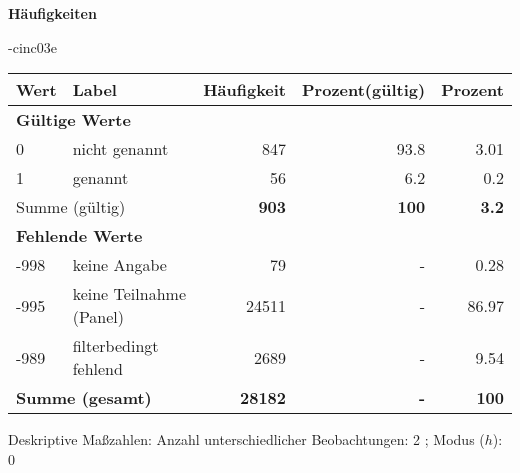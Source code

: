         		\vspace*{0.5cm}
                \noindent\textbf{Häufigkeiten}

                \vspace*{-\baselineskip}
					\begin{filecontents}{\jobname-cinc03e}
					\begin{longtable}{lXrrr}
					\toprule
					\textbf{Wert} & \textbf{Label} & \textbf{Häufigkeit} & \textbf{Prozent(gültig)} & \textbf{Prozent} \\
					\endhead
					\midrule
					\multicolumn{5}{l}{\textbf{Gültige Werte}}\\

					0 &
					\multicolumn{1}{X}{ nicht genannt   } &


					  \num{847} &
					  \num[round-mode=places,round-precision=2]{93.8} &
					    \num[round-mode=places,round-precision=2]{3.01} \\

					1 &
					\multicolumn{1}{X}{ genannt   } &


					  \num{56} &
					  \num[round-mode=places,round-precision=2]{6.2} &
					    \num[round-mode=places,round-precision=2]{0.2} \\
					\midrule
					\multicolumn{2}{l}{Summe (gültig)} &
					  \textbf{\num{903}} &
					\textbf{100} &
					  \textbf{\num[round-mode=places,round-precision=2]{3.2}} \\
					\multicolumn{5}{l}{\textbf{Fehlende Werte}}\\
							-998 &
							keine Angabe &
							  \num{79} &
							 - &
							  \num[round-mode=places,round-precision=2]{0.28} \\
							-995 &
							keine Teilnahme (Panel) &
							  \num{24511} &
							 - &
							  \num[round-mode=places,round-precision=2]{86.97} \\
							-989 &
							filterbedingt fehlend &
							  \num{2689} &
							 - &
							  \num[round-mode=places,round-precision=2]{9.54} \\
					\midrule
					\multicolumn{2}{l}{\textbf{Summe (gesamt)}} &
				      \textbf{\num{28182}} &
				    \textbf{-} &
				    \textbf{100} \\
					\bottomrule
					\end{longtable}
					\end{filecontents}
				\label{tableValues:cinc03e}
				\vspace*{-\baselineskip}
                    \begin{noten}
                	    \note{} Deskriptive Maßzahlen:
                	    Anzahl unterschiedlicher Beobachtungen: 2%
                	    ; 
                	      Modus ($h$): 0
                     \end{noten}


